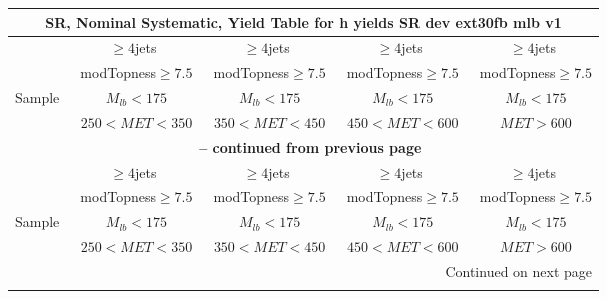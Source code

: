 \documentclass{article}
\begin{document}
\begin{longtable}{|l|c|c|c|c|} 
 
\multicolumn{5}{c}{ SR, Nominal Systematic, Yield Table for h yields SR dev ext30fb mlb v1 }\\* \hline 
  & $\ge4$jets  & $\ge4$jets  & $\ge4$jets  & $\ge4$jets \\* 
  & ~modTopness$\ge7.5$  & ~modTopness$\ge7.5$  & ~modTopness$\ge7.5$  & ~modTopness$\ge7.5$ \\* 
Sample  & ~$M_{lb}<175$  & ~$M_{lb}<175$  & ~$M_{lb}<175$  & ~$M_{lb}<175$ \\* 
  & ~$250<MET<350$  & ~$350<MET<450$  & ~$450<MET<600$  & ~$MET>600$ \\* 
\hline \hline 
\endfirsthead 
 
\multicolumn{5}{c}{{\bfseries \tablename\ \thetable{} -- continued from previous page}}\\* \hline 
  & $\ge4$jets  & $\ge4$jets  & $\ge4$jets  & $\ge4$jets \\* 
  & ~modTopness$\ge7.5$  & ~modTopness$\ge7.5$  & ~modTopness$\ge7.5$  & ~modTopness$\ge7.5$ \\* 
Sample  & ~$M_{lb}<175$  & ~$M_{lb}<175$  & ~$M_{lb}<175$  & ~$M_{lb}<175$ \\* 
  & ~$250<MET<350$  & ~$350<MET<450$  & ~$450<MET<600$  & ~$MET>600$ \\* 
\hline \hline 
\endhead 
 
\multicolumn{5}{|r|}{{Continued on next page}}\\* \hline 
\endfoot 
 
 
\endlastfoot 
 

\end{longtable}
\end{document}
